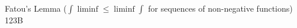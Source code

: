 \indexmedskip

Fatou's Lemma ($\int\liminf\le\liminf\int$
for sequences of non-negative functions) 123B


































































































































